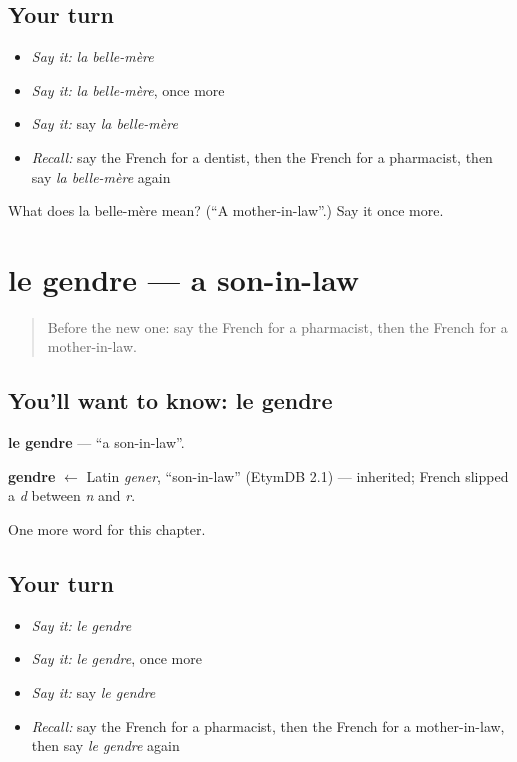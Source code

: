 \subsection*{Your turn}
\begin{itemize}
\raggedright
  \item \emph{Say it:} \emph{la belle-mère}
  \item \emph{Say it:} \emph{la belle-mère}, once more
  \item \emph{Say it:} say \emph{la belle-mère}
  \item \emph{Recall:} say the French for a dentist, then the French for a pharmacist, then say \emph{la belle-mère} again
\end{itemize}

\begin{tcolorbox}[breakable,colback=teal!4,colframe=teal!35!black,title={Before you move on}]
What does la belle-mère mean? (\textquotedblleft{}A mother-in-law\textquotedblright{}.) Say it once more.
\end{tcolorbox}
\section[le gendre]{le gendre — a son-in-law}

\label{lesson:FR-C167-gendre}



\begin{quote}
Before the new one: say the French for a pharmacist, then the French for a mother-in-law.
\end{quote}

\subsection*{You'll want to know: le gendre}
\textbf{le gendre} — \textquotedblleft{}a son-in-law\textquotedblright{}.

\begin{cousinweb}
\textbf{gendre} $\leftarrow$ Latin \emph{gener}, \textquotedblleft{}son-in-law\textquotedblright{} (EtymDB 2.1) — inherited; French slipped a \emph{d} between \emph{n} and \emph{r}.
\end{cousinweb}

\begin{grammarlens}[title={What you've built}]
One more word for this chapter.
\end{grammarlens}

\subsection*{Your turn}
\begin{itemize}
\raggedright
  \item \emph{Say it:} \emph{le gendre}
  \item \emph{Say it:} \emph{le gendre}, once more
  \item \emph{Say it:} say \emph{le gendre}
  \item \emph{Recall:} say the French for a pharmacist, then the French for a mother-in-law, then say \emph{le gendre} again
\end{itemize}

